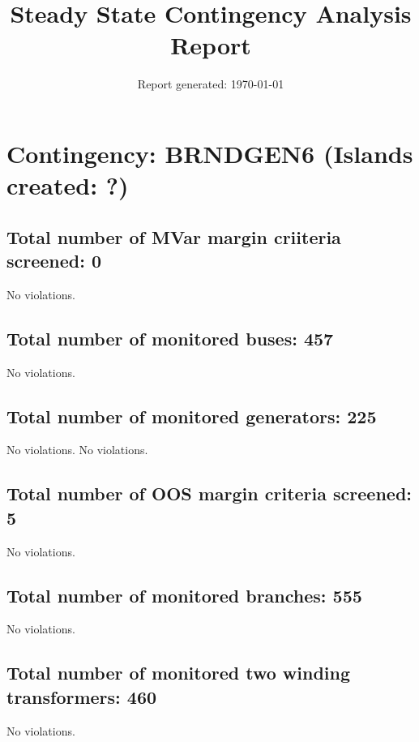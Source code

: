\documentclass{article}%
\title{Steady State Contingency Analysis Report\vspace{-3ex}}%
\date{Report generated: \today\vspace{-2ex}}%
\begin{document}
%
\normalsize%
\maketitle%
\section*{Contingency: BRNDGEN6 (Islands created: ?)}%
\label{sec:ContingencyBRNDGEN6(Islandscreated?)}%
\subsection*{Total number of MVar margin criiteria screened: 0}%
\label{subsec:TotalnumberofMVarmargincriiteriascreened0}%
No violations.

%
\subsection*{Total number of monitored buses: 457}%
\label{subsec:Totalnumberofmonitoredbuses457}%
No violations.

%
\subsection*{Total number of monitored generators: 225}%
\label{subsec:Totalnumberofmonitoredgenerators225}%
No violations.%
No violations.

%
\subsection*{Total number of OOS margin criteria screened: 5}%
\label{subsec:TotalnumberofOOSmargincriteriascreened5}%
No violations.

%
\subsection*{Total number of monitored branches: 555}%
\label{subsec:Totalnumberofmonitoredbranches555}%
No violations.

%
\subsection*{Total number of monitored two winding transformers: 460}%
\label{subsec:Totalnumberofmonitoredtwowindingtransformers460}%
No violations.

%
\end{document}
